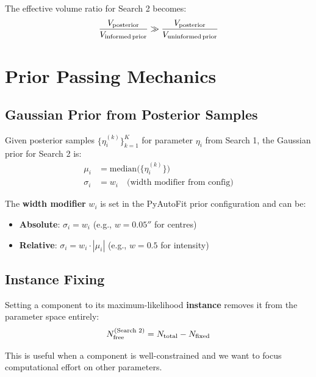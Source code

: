 \documentclass[11pt, letterpaper]{article}
\begin{document}
The effective volume ratio for Search 2 becomes:
\begin{equation}
\frac{V_{\rm posterior}}{V_{\rm informed\,prior}} \gg \frac{V_{\rm posterior}}{V_{\rm uninformed\,prior}}
\label{eq:informed-prior}
\end{equation}

\section{Prior Passing Mechanics}
\label{sec:prior-passing}

\subsection{Gaussian Prior from Posterior Samples}

Given posterior samples $\{\eta_i^{(k)}\}_{k=1}^K$ for parameter $\eta_i$
from Search 1, the Gaussian prior for Search 2 is:
\begin{align}
\mu_i &= \text{median}\bigl(\{\eta_i^{(k)}\}\bigr) \label{eq:prior-mean} \\
\sigma_i &= w_i \quad \text{(width modifier from config)} \label{eq:prior-sigma}
\end{align}

The \textbf{width modifier} $w_i$ is set in the PyAutoFit prior
configuration and can be:
\begin{itemize}[nosep]
  \item \textbf{Absolute}: $\sigma_i = w_i$ (e.g., $w = 0.05''$ for centres)
  \item \textbf{Relative}: $\sigma_i = w_i \cdot |\mu_i|$ (e.g., $w = 0.5$ for intensity)
\end{itemize}

\subsection{Instance Fixing}

Setting a component to its maximum-likelihood \textbf{instance} removes
it from the parameter space entirely:
\begin{equation}
N_{\rm free}^{(\text{Search 2})} = N_{\rm total} - N_{\rm fixed}
\end{equation}

This is useful when a component is well-constrained and we want to
focus computational effort on other parameters.
\end{document}
